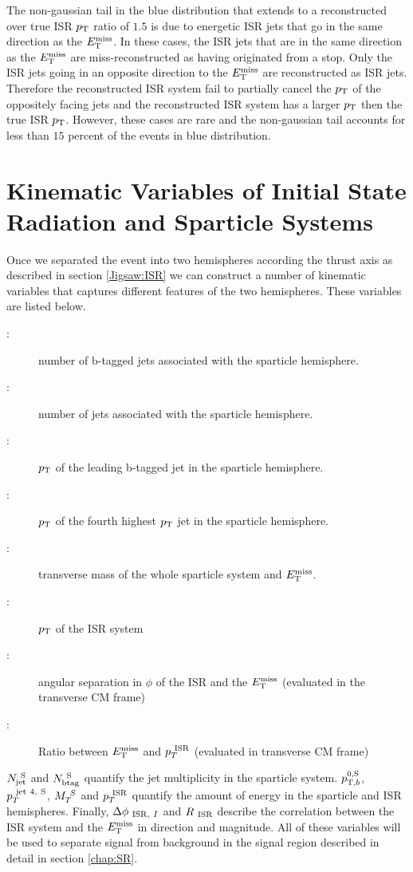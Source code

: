 \indent The non-gaussian tail in the blue distribution that extends to a reconstructed over true ISR $p_{\mathrm{T}}$ ratio of $1.5$ is due to energetic ISR jets that go in the same direction as the $E_{\mathrm{T}}^{\mathrm{miss}}$.  In these cases, the ISR jets that are in the same direction as the $E_{\mathrm{T}}^{\mathrm{miss}}$ are miss-reconstructed as having originated from a stop.  Only the ISR jets going in an opposite direction to the $E_{\mathrm{T}}^{\mathrm{miss}}$ are reconstructed as ISR jets.  Therefore the reconstructed ISR system fail to partially cancel the $p_{\mathrm{T}}$ of the oppositely facing jets and the reconstructed ISR system has a larger $p_{\mathrm{T}}$ then the true ISR $p_{\mathrm{T}}$.  However, these cases are rare and the non-gaussian tail accounts for less than $15$ percent of the events in blue distribution. \\

\section{Kinematic Variables of Initial State Radiation and Sparticle Systems}
\label{Jigsaw:Variables}

\indent Once we separated the event into two hemispheres according the thrust axis as described in section \ref{Jigsaw:ISR} we can construct a number of kinematic variables that captures different features of the two hemispheres.  These variables are listed below. \\

\begin{description}
\item [\boldmath \NbV:] number of b-tagged jets associated with the sparticle hemisphere.
\item [\boldmath \NjV:] number of jets associated with the sparticle hemisphere.
\item [\boldmath \pTSBZero:] $p_{\mathrm{T}}$ of the leading b-tagged jet in the sparticle hemisphere.
\item [\boldmath \pTjV:] $p_{\mathrm{T}}$ of the fourth highest $p_{\mathrm{T}}$ jet in the sparticle hemisphere.
\item [\boldmath \MS:] transverse mass of the whole sparticle system and $E_{\mathrm{T}}^{\mathrm{miss}}$.
\item [\boldmath \PTISR:] $p_{\mathrm{T}}$ of the ISR system
\item [\boldmath \dphiISRI:] angular separation in $\phi$ of the ISR and the $E_{\mathrm{T}}^{\mathrm{miss}}$ (evaluated in the transverse CM frame)
\item [\boldmath \RISR:] Ratio between $E_{\mathrm{T}}^{\mathrm{miss}}$ and $p_{T}^{~\mathrm{ISR}}$ (evaluated in transverse CM frame)
\end{description}

\indent $N_{\mathrm{jet}}^{~\mathrm{S}}$ and $N_{\mathrm{btag}}^{~\mathrm{S}}$ quantify the jet multiplicity in the sparticle system.  $p_{\mathrm{T},b}^{0,\mathrm{S}}$, $p_{T}^{~\mathrm{jet~4,~S}}$, $M_{T}^{~S}$ and $p_{T}^{~\mathrm{ISR}}$ quantify the amount of energy in the sparticle and ISR hemispheres.  Finally, $\Delta\phi_{~\mathrm{ISR},~I}$ and $R_{~\mathrm{ISR}}$ describe the correlation between the ISR system and the $E_{\mathrm{T}}^{\mathrm{miss}}$ in direction and magnitude.  All of these variables will be used to separate signal from background in the signal region described in detail in section \ref{chap:SR}. \\

